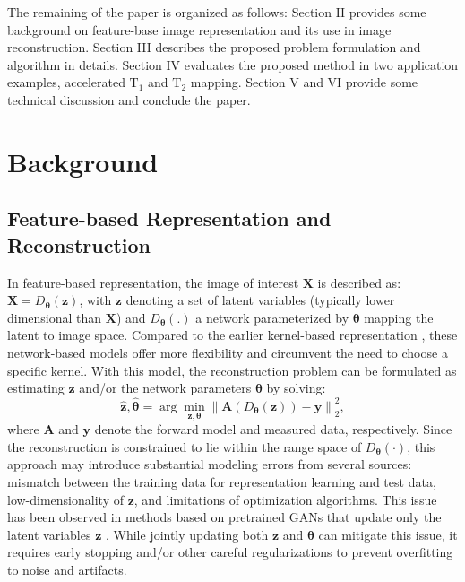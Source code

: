 \documentclass[journal,twoside,web]{ieeecolor}
\def\z{{\mathbf z}}
\def\X{{\mathbf X}}
\begin{document}
The remaining of the paper is organized as follows: Section
II provides some background on feature-base image representation and its use in image reconstruction. Section III describes the proposed problem formulation and algorithm in details. Section IV evaluates the proposed method in two application examples, accelerated $\text{T}_1$ and $\text{T}_2$ mapping. Section V and VI provide some
technical discussion and conclude the paper.


\section{Background}
\subsection{Feature-based Representation and Reconstruction}
In feature-based representation, the image of interest $\mathbf{X}$ is described as: $\mathbf{X} = D_{\boldsymbol{\theta}}(\mathbf{z})$, with $\mathbf{z}$ denoting a set of latent variables (typically lower dimensional than $\X$) and $D_{\boldsymbol{\theta}}(.)$ a network parameterized by $\boldsymbol{\theta}$ mapping the latent to image space. Compared to the earlier kernel-based representation \cite{wang2014pet,li2018constrained}, these network-based models offer more flexibility and circumvent the need to choose a specific kernel. With this model, the reconstruction problem can be formulated as estimating $\mathbf{z}$ and/or the network parameters $\boldsymbol{\theta}$ by solving:
\begin{equation}
\mathbf{\hat{z}},\boldsymbol{\hat{\theta}}=\arg\min _{\mathbf{z},\boldsymbol{\theta}} \left\|\mathbf{A}(D_{\boldsymbol{\theta}}(\mathbf{z}))-\mathbf{y}\right\|_2^2, 
\label{Background_recon}
\end{equation}
where $\mathbf{A}$ and $\mathbf{y}$ denote the forward model and measured data, respectively. Since the reconstruction is constrained to lie within the range space of $D_{\boldsymbol{\theta}}(\cdot)$, this approach may introduce substantial modeling errors from several sources: mismatch between the training data for representation learning and test data, low-dimensionality of $\z$, and limitations of optimization algorithms. This issue has been observed in methods based on pretrained GANs that update only the latent variables $\mathbf{z}$ \cite{bora2017compressed}. While jointly updating both $\mathbf{z}$ and $\boldsymbol{\theta}$ can mitigate this issue, it requires early stopping and/or other careful regularizations to prevent overfitting to noise and artifacts. 
\end{document}

